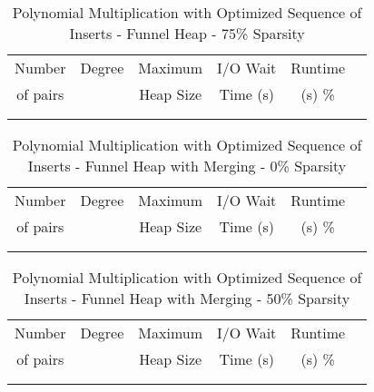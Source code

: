 \documentclass[11pt, one-sided]{amsart}
\begin{document}
\begin{table}[htbp]
   \centering
      \caption{Polynomial Multiplication with Optimized Sequence of Inserts - Funnel Heap - 75\% Sparsity}
   \begin{tabular}{|c|c|c|c|c|c|}
   	\hline
		 Number   & 	Degree	& Maximum & I/O Wait		& Runtime 	 \\ 
		 of pairs 	&			& Heap Size	& Time (s)		&	(s)		 		\%				\\ \hline
		 		&			&			&			&						\\
		 		&			&			&			&						\\
   \end{tabular}
   \label{tab:booktabs}
\end{table}



\newpage


\begin{table}[htbp]
   \centering
      \caption{Polynomial Multiplication with Optimized Sequence of Inserts - Funnel Heap with Merging - 0\% Sparsity}
   \begin{tabular}{|c|c|c|c|c|c|}
   	\hline
		 Number   & 	Degree	& Maximum & I/O Wait		&  Runtime  \\ 
		 of pairs 	&			& Heap Size	& Time (s)		&	(s)	 		\%				\\ \hline
		 		&			&			&			&					\\
		 		&			&			&			&					\\
   \end{tabular}
   \label{tab:booktabs}
\end{table}

\begin{table}[htbp]
   \centering
      \caption{Polynomial Multiplication with Optimized Sequence of Inserts - Funnel Heap with Merging - 50\% Sparsity}
   \begin{tabular}{|c|c|c|c|c|c|}
   	\hline
		 Number   & 	Degree	& Maximum & 	I/O Wait	&  Runtime 	 \\ 
		 of pairs 	&			& Heap Size	& 	Time (s)		&	(s)	 		\%				\\ \hline
		 		&			&			&			&						\\
		 		&			&			&			&						\\
   \end{tabular}
   \label{tab:booktabs}
\end{table}
\end{document}
